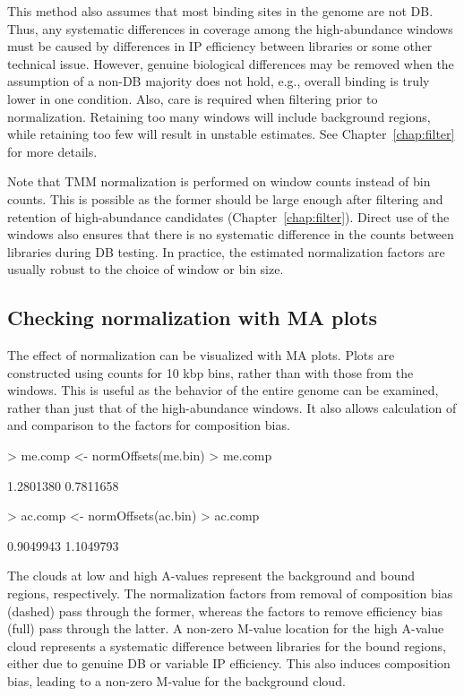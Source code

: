 \documentclass[12pt]{report}
\renewenvironment{Schunk}{\vspace{0pt}}{\vspace{0pt}}
\begin{document}
This method also assumes that most binding sites in the genome are not DB.
Thus, any systematic differences in coverage among the high-abundance windows must be caused by differences in IP efficiency between libraries or some other technical issue.
However, genuine biological differences may be removed when the assumption of a non-DB majority does not hold, e.g., overall binding is truly lower in one condition. 
Also, care is required when filtering prior to normalization.
Retaining too many windows will include background regions, while retaining too few will result in unstable estimates.
See Chapter~\ref{chap:filter} for more details.

Note that TMM normalization is performed on window counts instead of bin counts.
This is possible as the former should be large enough after filtering and retention of high-abundance candidates (Chapter~\ref{chap:filter}).
Direct use of the windows also ensures that there is no systematic difference in the counts between libraries during DB testing.
In practice, the estimated normalization factors are usually robust to the choice of window or bin size. 

\subsection{Checking normalization with MA plots}
\label{sec:eff_norm_ma}

The effect of normalization can be visualized with MA plots. 
Plots are constructed using counts for 10 kbp bins, rather than with those from the windows.
This is useful as the behavior of the entire genome can be examined, rather than just that of the high-abundance windows.
It also allows calculation of and comparison to the factors for composition bias.

\begin{Schunk}
\begin{Sinput}
> me.comp <- normOffsets(me.bin)
> me.comp
\end{Sinput}
\begin{Soutput}
[1] 1.2801380 0.7811658
\end{Soutput}
\begin{Sinput}
> ac.comp <- normOffsets(ac.bin)
> ac.comp
\end{Sinput}
\begin{Soutput}
[1] 0.9049943 1.1049793
\end{Soutput}
\end{Schunk}

The clouds at low and high A-values represent the background and bound regions, respectively.
The normalization factors from removal of composition bias (dashed) pass through the former, whereas the factors to remove efficiency bias (full) pass through the latter.
A non-zero M-value location for the high A-value cloud represents a systematic difference between libraries for the bound regions, either due to genuine DB or variable IP efficiency. 
This also induces composition bias, leading to a non-zero M-value for the background cloud.
\end{document}

